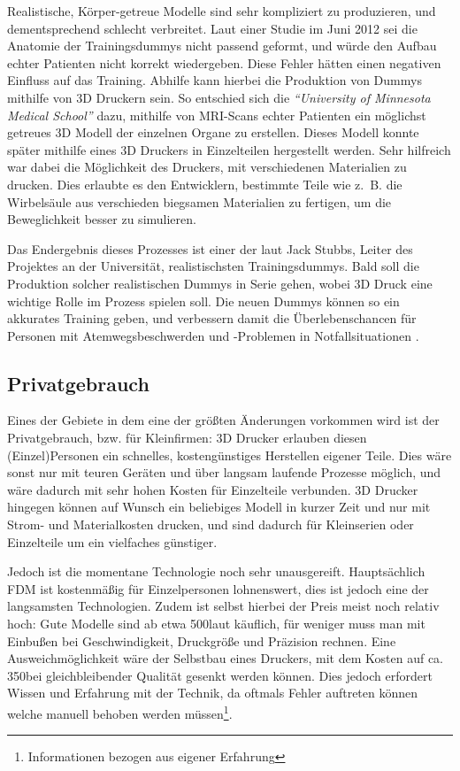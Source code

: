 Realistische, Körper-getreue Modelle sind sehr kompliziert zu produzieren, und dementsprechend schlecht verbreitet. Laut einer Studie im Juni 2012 sei die Anatomie der Trainingsdummys nicht passend geformt, und würde den Aufbau echter Patienten nicht korrekt wiedergeben. Diese Fehler hätten einen negativen Einfluss auf das Training. Abhilfe kann hierbei die Produktion von Dummys mithilfe von 3D Druckern sein. So entschied sich die \emph{\textquotedblleft University of Minnesota Medical School\textquotedblright} dazu, mithilfe von MRI-Scans echter Patienten ein möglichst getreues 3D Modell der einzelnen Organe zu erstellen. Dieses Modell konnte später mithilfe eines 3D Druckers in Einzelteilen hergestellt werden. Sehr hilfreich war dabei die Möglichkeit des Druckers, mit verschiedenen Materialien zu drucken. Dies erlaubte es den Entwicklern, bestimmte Teile wie z.~B. die Wirbelsäule aus verschieden biegsamen Materialien zu fertigen, um die Beweglichkeit besser zu simulieren. 

Das Endergebnis dieses Prozesses ist einer der laut Jack Stubbs, Leiter des Projektes an der Universität, realistischsten Trainingsdummys. Bald soll die Produktion solcher realistischen Dummys in Serie gehen, wobei 3D Druck eine wichtige Rolle im Prozess spielen soll. Die neuen Dummys können so ein akkurates Training geben, und verbessern damit die Überlebenschancen für Personen mit Atemwegsbeschwerden und -Problemen in Notfallsituationen \parencite{DUMMY_STUDY}.


\subsection{Privatgebrauch}

Eines der Gebiete in dem eine der größten Änderungen vorkommen wird ist der Privatgebrauch, bzw. für Kleinfirmen:
3D Drucker erlauben diesen (Einzel)Personen ein schnelles, kostengünstiges Herstellen eigener Teile. Dies wäre sonst nur mit teuren Geräten und über langsam laufende Prozesse möglich, und wäre dadurch mit sehr hohen Kosten für Einzelteile verbunden. 3D Drucker hingegen können auf Wunsch ein beliebiges Modell in kurzer Zeit und nur mit Strom- und Materialkosten drucken, und sind dadurch für Kleinserien oder Einzelteile um ein vielfaches günstiger. 

Jedoch ist die momentane Technologie noch sehr unausgereift. Hauptsächlich FDM ist kostenmäßig für Einzelpersonen lohnenswert, dies ist jedoch eine der langsamsten Technologien. Zudem ist selbst hierbei der Preis meist noch relativ hoch: Gute Modelle sind ab etwa 500\EURO laut \textcite{TOM_PRINTER} käuflich, für weniger muss man mit Einbußen bei Geschwindigkeit, Druckgröße und Präzision rechnen. Eine Ausweichmöglichkeit wäre der Selbstbau eines Druckers, mit dem Kosten auf ca. 350\EURO bei gleichbleibender Qualität gesenkt werden können. Dies jedoch erfordert Wissen und Erfahrung mit der Technik, da oftmals Fehler auftreten können welche manuell behoben werden müssen\footnote{Informationen bezogen aus eigener Erfahrung}.

